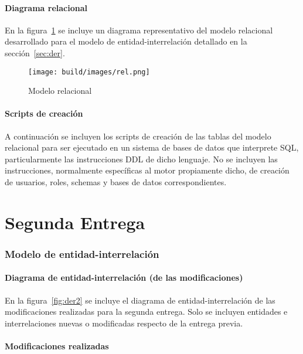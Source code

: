 \documentclass[a4paper,11pt]{article}
\begin{document}
\subsection{Diagrama relacional}

En la figura~\ref{fig:relacional} se incluye un diagrama representativo del
modelo relacional desarrollado para el modelo de entidad-interrelación
detallado en la sección~\ref{sec:der}.

\begin{figure}[h!t]
  \centering
  \texttt{[image: build/images/rel.png]}
  \caption{Modelo relacional} \label{fig:relacional}
\end{figure}

\FloatBarrier

\subsection{Scripts de creación}

A continuación se incluyen los scripts de creación de las tablas del modelo
relacional para ser ejecutado en un sistema de bases de datos que interprete
SQL, particularmente las instrucciones DDL de dicho lenguaje. No se incluyen
las instrucciones, normalmente específicas al motor propiamente dicho, de
creación de usuarios, roles, schemas y bases de datos correspondientes.



\clearpage

\part{Segunda Entrega}
\section{Modelo de entidad-interrelación} \label{sec:der2}

\subsection{Diagrama de entidad-interrelación (de las modificaciones)}

En la figura~\ref{fig:der2} se incluye el diagrama de entidad-interrelación
de las modificaciones realizadas para la segunda entrega. Solo se incluyen
entidades e interrelaciones nuevas o modificadas respecto de la entrega previa.

\subsection{Modificaciones realizadas}
\end{document}

